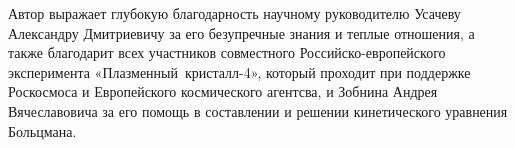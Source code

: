 \Acknowledgements %
Автор выражает глубокую благодарность научному
руководителю Усачеву Александру Дмитриевичу за его безупречные знания и теплые отношения,
а также благодарит всех участников совместного Российско-европейского эксперимента «Плазменный~кристалл-4», который
проходит при поддержке Роскосмоса и Европейского космического агентсва, и Зобнина Андрея
Вячеславовича за его помощь в составлении и решении кинетического уравнения Больцмана.



